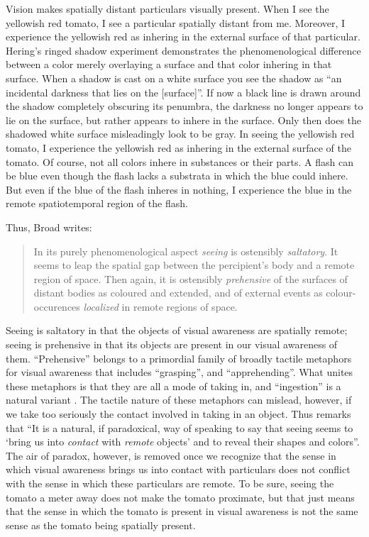 \documentclass[12pt]{article}
\begin{document}
Vision makes spatially distant particulars visually present. When I see the yellowish red tomato, I see a particular spatially distant from me. Moreover, I experience the yellowish red as inhering in the external surface of that particular. Hering's \citeyearpar[8]{Hering:1920ty} ringed shadow experiment demonstrates the phenomenological difference between a color merely overlaying a surface and that color inhering in that surface. When a shadow is cast on a white surface you see the shadow as ``an incidental darkness that lies on the [surface]''. If now a black line is drawn around the shadow completely obscuring its penumbra, the darkness no longer appears to lie on the surface, but rather appears to inhere in the surface. Only then does the shadowed white surface misleadingly look to be gray. In seeing the yellowish red tomato, I experience the yellowish red as inhering in the external surface of the tomato. Of course, not all colors inhere in substances or their parts. A flash can be blue even though the flash lacks a substrata in which the blue could inhere. But even if the blue of the flash inheres in nothing, I experience the blue in the remote spatiotemporal region of the flash. 

Thus, Broad writes:
\begin{quote}
    In its purely phenomenological aspect \emph{seeing} is ostensibly \emph{saltatory}. It seems to leap the spatial gap between the percipient's body and a remote region of space. Then again, it is ostensibly \emph{prehensive} of the surfaces of distant bodies as coloured and extended, and of external events as colour-occurences \emph{localized} in remote regions of space. \citep[32]{Broad:1965dq}
\end{quote}
Seeing is saltatory in that the objects of visual awareness are spatially remote; seeing is prehensive in that its objects are present in our visual awareness of them. ``Prehensive'' belongs to a primordial family of broadly tactile metaphors for visual awareness that includes ``grasping'', and ``apprehending''. What unites these metaphors is that they are all a mode of taking in, and ``ingestion'' is a natural variant \citep[see][7]{Johnston:2006uq,Price:1932fk}. The tactile nature of these metaphors can mislead, however, if we take too seriously the contact involved in taking in an object. Thus \citet[32?]{Broad:1965dq} remarks that ``It is a natural, if paradoxical, way of speaking to say that seeing seems to `bring us into \emph{contact} with \emph{remote} objects' and to reveal their shapes and colors''. The air of paradox, however, is removed once we recognize that the sense in which visual awareness brings us into contact with particulars does not conflict with the sense in which these particulars are remote. To be sure, seeing the tomato a meter away does not make the tomato proximate, but that just means that the sense in which the tomato is present in visual awareness is not the same sense as the tomato being spatially present.
\end{document}
